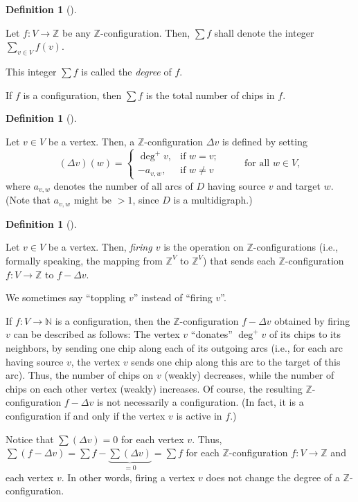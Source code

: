\documentclass[numbers=enddot,12pt,final,onecolumn,notitlepage]{scrartcl}%
\theoremstyle{definition}
\newtheorem{defi}[theo]{Definition}
\newenvironment{definition}[1][]
{\begin{defi}[#1]\begin{leftbar}}
{\end{leftbar}\end{defi}}
\let\sumnonlimits\sum
\renewcommand{\sum}{\sumnonlimits\limits}
\newcommand{\NN}{\mathbb{N}}
\newcommand{\ZZ}{\mathbb{Z}}
\newcommand{\tup}[1]{\left( #1 \right)}
\begin{document}
\begin{definition}
Let $f : V \to \ZZ$ be any $\ZZ$-configuration.
Then, $\sum f$ shall denote the integer
$\sum_{v \in V} f \tup{v}$.

This integer $\sum f$ is called the \textit{degree} of $f$.
\end{definition}

If $f$ is a configuration, then $\sum f$ is the total
number of chips in $f$.

\begin{definition}
Let $v \in V$ be a vertex.
Then, a $\ZZ$-configuration $\Delta v$ is defined by setting
\[
 \tup{\Delta v} \tup{w}
 = \begin{cases}
    \deg^+ v , & \text{if } w = v ; \\
    - a_{v, w}, & \text{if } w \neq v
   \end{cases}
  \qquad \text{ for all } w \in V ,
\]
where $a_{v, w}$ denotes the number of all arcs of $D$ having
source $v$ and target $w$.
(Note that $a_{v, w}$ might be $> 1$, since $D$ is a multidigraph.)
\end{definition}

\begin{definition}
Let $v \in V$ be a vertex.
Then, \textit{firing $v$} is the operation on
$\ZZ$-configurations (i.e., formally speaking, the mapping from
$\ZZ^V$ to $\ZZ^V$) that sends each $\ZZ$-configuration
$f : V \to \ZZ$ to $f - \Delta v$.

We sometimes say ``toppling $v$'' instead of ``firing $v$''.
\end{definition}

If $f : V \to \NN$ is a configuration, then the
$\ZZ$-configuration $f - \Delta v$ obtained by firing $v$ can be
described as follows:
The vertex $v$ ``donates'' $\deg^+ v$ of its chips to its
neighbors, by sending one chip along each of its outgoing arcs
(i.e., for each arc having source $v$, the vertex $v$ sends one
chip along this arc to the target of this arc).
Thus, the number of chips on $v$ (weakly) decreases, while the
number of chips on each other vertex (weakly) increases.
Of course, the resulting $\ZZ$-configuration $f - \Delta v$ is
not necessarily a configuration.
(In fact, it is a configuration if and only if the vertex $v$ is
active in $f$.)

Notice that $\sum \tup{\Delta v} = 0$ for each vertex $v$.
Thus,
$\sum \tup{f - \Delta v}
= \sum f - \underbrace{\sum \tup{\Delta v}}_{= 0}
= \sum f$
for each $\ZZ$-configuration $f : V \to \ZZ$ and each vertex $v$.
In other words, firing a vertex $v$ does not change the degree of
a $\ZZ$-configuration.
\end{document}
